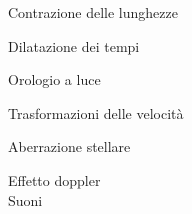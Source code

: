 \documentclass[a4_2,grid,frame]{flashcards}
\begin{document}
\begin{flashcard}[Effetto]{Contrazione delle lunghezze}

\end{flashcard}

\begin{flashcard}[Effetto]{Dilatazione dei tempi}

\end{flashcard}

\begin{flashcard}[Esempio]{Orologio a luce}

\end{flashcard}

\begin{flashcard}[Formule]{Trasformazioni delle velocità}

\end{flashcard}

\begin{flashcard}[Effetto]{Aberrazione stellare}

\end{flashcard}

\begin{flashcard}[Effetto]{Effetto doppler\\Suoni}

\end{flashcard}
\end{document}
